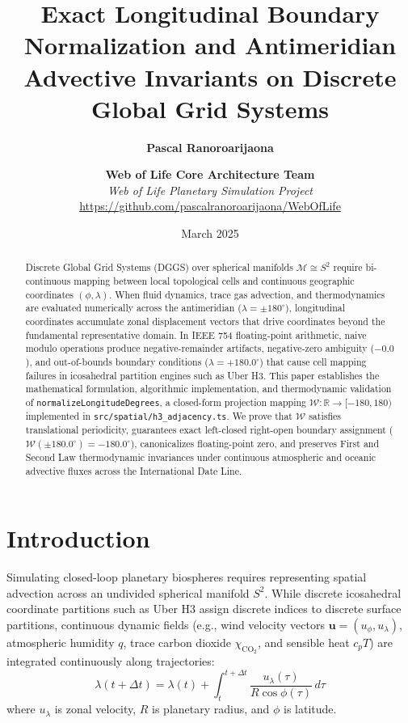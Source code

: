 \documentclass[11pt,a4paper]{article}
\title{\textbf{Exact Longitudinal Boundary Normalization and Antimeridian Advective Invariants on Discrete Global Grid Systems}}
\author{
  \textbf{Pascal Ranoroarijaona} \and \textbf{Web of Life Core Architecture Team} \\
  \textit{Web of Life Planetary Simulation Project} \\
  \url{https://github.com/pascalranoroarijaona/WebOfLife}
}
\date{March 2025}
\theoremstyle{definition}
\begin{document}
\maketitle

\begin{abstract}
Discrete Global Grid Systems (DGGS) over spherical manifolds $\mathcal{M} \cong S^2$ require bi-continuous mapping between local topological cells and continuous geographic coordinates $(\phi, \lambda)$. When fluid dynamics, trace gas advection, and thermodynamics are evaluated numerically across the antimeridian ($\lambda = \pm 180^\circ$), longitudinal coordinates accumulate zonal displacement vectors that drive coordinates beyond the fundamental representative domain. In IEEE 754 floating-point arithmetic, naive modulo operations produce negative-remainder artifacts, negative-zero ambiguity ($-0.0$), and out-of-bounds boundary conditions ($\lambda = +180.0^\circ$) that cause cell mapping failures in icosahedral partition engines such as Uber H3. This paper establishes the mathematical formulation, algorithmic implementation, and thermodynamic validation of \texttt{normalizeLongitudeDegrees}, a closed-form projection mapping $\mathcal{W}: \mathbb{R} \to [-180, 180)$ implemented in \texttt{src/spatial/h3\_adjacency.ts}. We prove that $\mathcal{W}$ satisfies translational periodicity, guarantees exact left-closed right-open boundary assignment ($\mathcal{W}(\pm 180.0^\circ) = -180.0^\circ$), canonicalizes floating-point zero, and preserves First and Second Law thermodynamic invariances under continuous atmospheric and oceanic advective fluxes across the International Date Line.
\end{abstract}

\section{Introduction}
Simulating closed-loop planetary biospheres requires representing spatial advection across an undivided spherical manifold $S^2$. While discrete icosahedral coordinate partitions such as Uber H3 assign discrete indices to discrete surface partitions, continuous dynamic fields (e.g., wind velocity vectors $\mathbf{u} = (u_\phi, u_\lambda)$, atmospheric humidity $q$, trace carbon dioxide $\chi_{\text{CO}_2}$, and sensible heat $c_p T$) are integrated continuously along trajectories:
\begin{equation}
\lambda(t + \Delta t) = \lambda(t) + \int_{t}^{t+\Delta t} \frac{u_\lambda(\tau)}{R \cos \phi(\tau)} \, d\tau
\end{equation}
where $u_\lambda$ is zonal velocity, $R$ is planetary radius, and $\phi$ is latitude.
\end{document}
